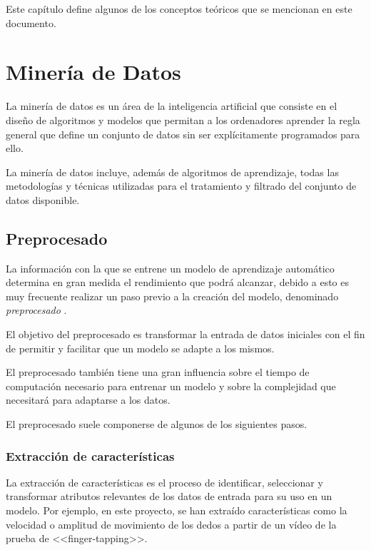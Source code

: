 \label{cha:Conceptos teóricos}

Este capítulo define algunos de los conceptos teóricos que se mencionan en este
documento.

\section{Minería de Datos}

La minería de datos es un área de la inteligencia artificial que consiste en el
diseño de algoritmos y modelos que permitan a los ordenadores aprender la regla
general que define un conjunto de datos sin ser explícitamente programados para
ello.

La minería de datos incluye, además de algoritmos de aprendizaje, todas las
metodologías y técnicas utilizadas para el tratamiento y filtrado del conjunto
de datos disponible.

\subsection{Preprocesado}

La información con la que se entrene un modelo de aprendizaje automático
determina en gran medida el rendimiento que podrá alcanzar, debido a esto es muy
frecuente realizar un paso previo a la creación del modelo, denominado
\textit{preprocesado} \cite{enwiki:1138293751}.

El objetivo del preprocesado es transformar la entrada de datos iniciales con el
fin de permitir y facilitar que un modelo se adapte a los mismos.

El preprocesado también tiene una gran influencia sobre el tiempo de computación
necesario para entrenar un modelo y sobre la complejidad que necesitará para
adaptarse a los datos.

El preprocesado suele componerse de algunos de los siguientes pasos.

\subsubsection{Extracción de características}

La extracción de características es el proceso de identificar, seleccionar y
transformar atributos relevantes de los datos de entrada para su uso en un
modelo. Por ejemplo, en este proyecto, se han extraído características como la
velocidad o amplitud de movimiento de los dedos a partir de un vídeo de la
prueba de <<finger-tapping>>.

